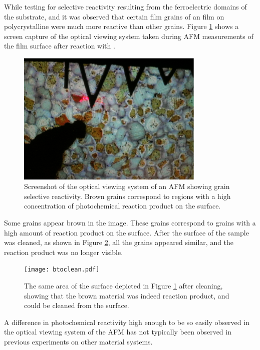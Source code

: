 While testing for selective reactivity resulting from the ferroelectric domains of the substrate, and it was observed that certain film grains of an  film on polycrystalline  were much more reactive than other grains. Figure \ref{fig:btoreacted} shows a screen capture of the optical viewing system taken during AFM measurements of the film surface after reaction with .
\begin{figure}[htbp]
\begin{center}
\includegraphics[width=0.8\textwidth]{btoreacted.pdf}
\caption[Optical image showing grain selective reactivity]{Screenshot of the optical viewing system of an AFM showing grain selective reactivity. Brown grains correspond to regions with a high concentration of photochemical reaction product on the surface.}
\label{fig:btoreacted} %
\end{center}
\end{figure}
Some grains appear brown in the image. These grains correspond to grains with a high amount of reaction product on the surface. After the surface of the sample was cleaned, as shown in Figure \ref{fig:btoclean}, all the grains appeared similar, and the reaction product was no longer visible.
\begin{figure}[htbp]
\begin{center}
\texttt{[image: btoclean.pdf]}
\caption[Area of the surface depicted in Figure \ref{fig:btoreacted} after cleaning]{The same area of the surface depicted in Figure \ref{fig:btoreacted} after cleaning, showing that the brown material was indeed reaction product, and could be cleaned from the surface.}
\label{fig:btoclean} %
\end{center}
\end{figure}
A difference in photochemical reactivity high enough to be so easily observed in the optical viewing system of the AFM has not typically been observed in previous experiments on other material systems.

